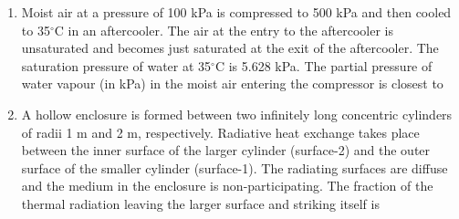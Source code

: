 \documentclass[journal,12pt,onecolumn]{IEEEtran}
\begin{document}
\begin{enumerate}[resume]
          \begin{enumerate}
          \end{enumerate}

    \item Moist air at a pressure of 100 kPa is compressed to 500 kPa and then cooled to 35$^\circ$C in an aftercooler. The air at the entry to the aftercooler is unsaturated and becomes just saturated at the exit of the aftercooler. The saturation pressure of water at 35$^\circ$C is 5.628 kPa. The partial pressure of water vapour (in kPa) in the moist air entering the compressor is closest to\\

          \begin{enumerate}
          \end{enumerate}

    \item A hollow enclosure is formed between two infinitely long concentric cylinders of radii 1 m and 2 m, respectively. Radiative heat exchange takes place between the inner surface of the larger cylinder (surface-2) and the outer surface of the smaller cylinder (surface-1). The radiating surfaces are diffuse and the medium in the enclosure is non-participating. The fraction of the thermal radiation leaving the larger surface and striking itself is


\end{enumerate}
\end{document}
